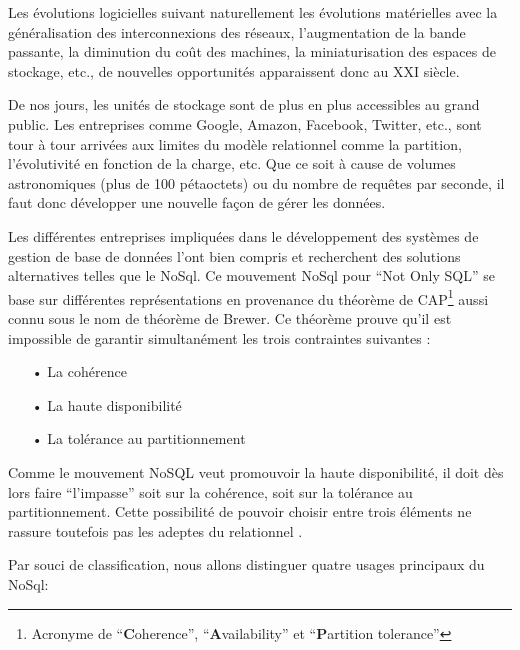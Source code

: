 \documentclass[a4paper,fleqn,12pt,oneside]{book}
\begin{document}
Les évolutions logicielles suivant naturellement les évolutions matérielles avec la généralisation des interconnexions des réseaux, l'augmentation de la bande passante, la diminution du coût des machines, la miniaturisation des espaces de stockage, etc., de nouvelles opportunités apparaissent donc au XXI siècle.

De nos jours, les unités de stockage sont de plus en plus accessibles au grand public. Les entreprises comme Google, Amazon, Facebook, Twitter, etc., sont tour à tour arrivées aux limites du modèle relationnel \cite{frishman1998comprehensive} comme la partition, l'évolutivité en fonction de la charge, etc. Que ce soit à cause de volumes astronomiques (plus de 100 pétaoctets) ou du nombre de requêtes par seconde, il faut donc développer une nouvelle façon de gérer les données.

Les différentes entreprises impliquées dans le développement des systèmes de gestion de base de données l'ont bien compris et recherchent des solutions alternatives telles que le NoSql\cite{nance2013nosql}. Ce mouvement NoSql pour \enquote{Not Only SQL} se base sur différentes représentations en provenance du théorème de CAP\footnote{Acronyme de \enquote{\textbf{C}oherence}, \enquote{\textbf{A}vailability} et \enquote{\textbf{P}artition tolerance}} aussi connu sous le nom de théorème de Brewer. Ce théorème prouve qu’il est impossible de garantir simultanément les trois contraintes suivantes : 
\begin{itemize}
\item[•]La cohérence
\item[•] La haute disponibilité
\item[•] La tolérance au partitionnement
\end{itemize}

Comme le mouvement
NoSQL veut promouvoir la haute disponibilité, il doit dès lors faire \enquote{l'impasse} soit sur la
cohérence, soit sur la tolérance au partitionnement. Cette possibilité de pouvoir choisir entre
trois éléments ne rassure toutefois pas les adeptes du relationnel \cite{di2012adoption}.

Par souci de classification, nous allons distinguer quatre usages principaux du NoSql:
\end{document}
